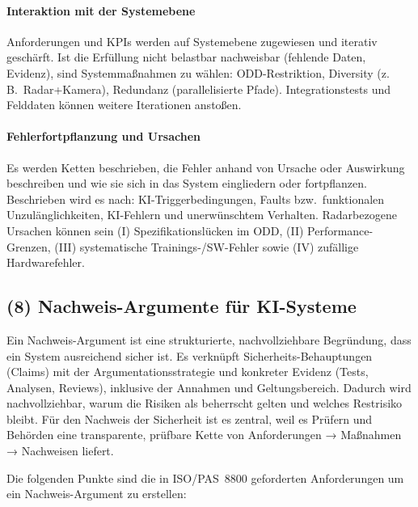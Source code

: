 \paragraph{Interaktion mit der Systemebene}
Anforderungen und KPIs werden auf Systemebene zugewiesen und iterativ geschärft. Ist die Erfüllung 
nicht belastbar nachweisbar (fehlende Daten, Evidenz), sind Systemmaßnahmen zu wählen: 
ODD-Restriktion, Diversity (z.\,B.\ Radar+\-Kamera), Redundanz (parallelisierte Pfade). Integrationstests 
und Felddaten können weitere Iterationen anstoßen.

\paragraph{Fehlerfortpflanzung und Ursachen}
Es werden Ketten beschrieben, die Fehler anhand von Ursache oder Auswirkung beschreiben
und wie sie sich in das System eingliedern oder fortpflanzen. Beschrieben wird es nach:
KI-Triggerbedingungen, Faults bzw.\ funktionalen Unzulänglichkeiten, 
KI-Fehlern und unerwünschtem Verhalten. Radarbezogene Ursachen können sein (I) Spezifikationslücken im 
ODD, (II) Performance-Grenzen, (III) systematische Trainings-/SW-Fehler 
sowie (IV) zufällige Hardwarefehler.


\subsection{(8) Nachweis-Argumente für KI-Systeme}
Ein Nachweis-Argument ist eine strukturierte, nachvollziehbare Begründung, dass ein System ausreichend sicher ist. 
Es verknüpft Sicherheits-Behauptungen (Claims) mit der Argumentationsstrategie und konkreter Evidenz 
(Tests, Analysen, Reviews), inklusive der Annahmen und Geltungsbereich. Dadurch wird nachvollziehbar, 
warum die Risiken als beherrscht gelten und welches Restrisiko bleibt. Für den Nachweis der Sicherheit 
ist es zentral, weil es Prüfern und Behörden eine transparente, prüfbare Kette von Anforderungen → Maßnahmen → Nachweisen liefert.

Die folgenden Punkte sind die in ISO/PAS~8800 geforderten Anforderungen um ein Nachweis-Argument zu erstellen:

